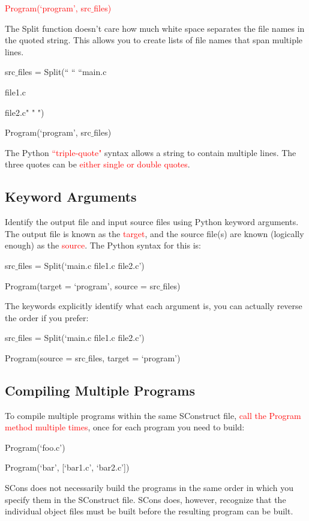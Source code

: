 \documentclass[12pt,a4paper]{article}
\begin{document}
\textcolor{red}{Program(`program', src$\_$files)}

The Split function doesn't care how much white space separates the file names in the quoted string. This allows you to create lists of file names that span multiple lines.

src$\_$files = Split(`` `` ``main.c

                     file1.c

                     file2.c" " ")
                   
Program(`program', src$\_$files)

The Python \textcolor{red}{``triple-quote"} syntax allows a string to contain multiple lines. The three quotes can be \textcolor{red}{either single or double quotes}.

\subsection{Keyword Arguments}
Identify the output file and input source files using Python keyword arguments. The output file is known as the \textcolor{red}{target}, and the source file(s) are known (logically enough) as the \textcolor{red}{source}. The Python syntax for this is:

src$\_$files = Split(`main.c file1.c file2.c')

Program(target = `program', source = src$\_$files)

The keywords explicitly identify what each argument is, you can actually reverse the order if you prefer:

src$\_$files = Split(`main.c file1.c file2.c')

Program(source = src$\_$files, target = `program')


\subsection{Compiling Multiple Programs}
To compile multiple programs within the same SConstruct file, \textcolor{red}{call the Program method multiple times}, once for each program you need to build:

Program(`foo.c')

Program(`bar', [`bar1.c', `bar2.c'])

SCons does not necessarily build the programs in the same order in which you specify them in the SConstruct file. SCons does, however, recognize that the individual object files must be built before the resulting program can be built. 
\end{document}
